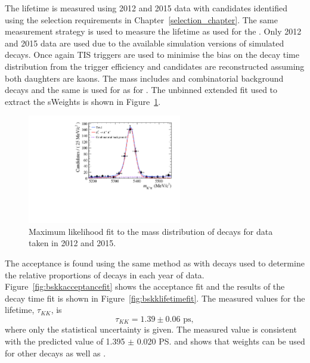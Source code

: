 The \bskk lifetime is measured using 2012 and 2015 data with \bskk candidates identified using the selection requirements in Chapter~\ref{selection_chapter}. The same measurement strategy is used to measure the \bskk lifetime as used for the \bsmumu \el. %
Only 2012 and 2015 data are used due to the available simulation versions of simulated \bskk decays. Once again TIS triggers are used to minimise the bias on the decay time distribution from the trigger efficiency and candidates are reconstructed assuming both daughters are kaons. The mass \pdf includes \bskk and combinatorial background decays and the same \pdf is used for \bskk as for \bskpi. The unbinned extended \ml fit used to extract the sWeights is shown in Figure~\ref{fig:bskkmassfit}. 

\begin{figure}[tbp]
\centering
  \includegraphics[width=0.6\textwidth]{./Figs/LifetimeSystematics/Bs2KK_mass_fit.pdf}
\caption{Maximum likelihood fit to the mass distribution of \bskk decays for data taken in 2012 and 2015.}%
\label{fig:bskkmassfit}
\end{figure}


The \bskk acceptance is found using the same method as \bsmumu with \bsjpsiphi decays used to determine the relative proportions of decays in each year of data. Figure~\ref{fig:bskkacceptancefit} shows the acceptance fit and the results of the decay time fit is shown in Figure~\ref{fig:bskklifetimefit}. The measured values for the lifetime, $\tau_{KK}$, is
\begin{equation}
\tau_{KK} = 1.39 \pm 0.06  \text{ ps}, 
\end{equation}
where only the statistical uncertainty is given. %
The measured value is consistent with the predicted value of 1.395 $\pm$ 0.020 \ps \cite{Aaij:2014fia} and shows that \bdkpi weights can be used for other decays as well as \bdkpi. 

